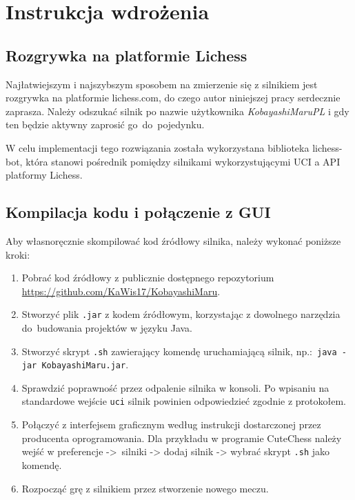 \chapter{Instrukcja wdrożenia}
\label{ch:instrukcja-wdrozenia}

\section{Rozgrywka na platformie Lichess}
\label{sec:rozgrywka-na-platformie-lichess}
Najłatwiejszym i najszybszym sposobem na zmierzenie się z silnikiem jest rozgrywka na platformie lichess.com, do czego autor niniejszej pracy serdecznie zaprasza.
Należy odszukać silnik po nazwie użytkownika \textit{KobayashiMaruPL} i gdy ten będzie aktywny zaprosić go~do~pojedynku.

W celu implementacji tego rozwiązania została wykorzystana biblioteka lichess-bot, która stanowi pośrednik pomiędzy silnikami wykorzystującymi UCI a API platformy Lichess. \cite{lichess-bot-docs}

\section{Kompilacja kodu i połączenie z GUI}
\label{sec:kompilacja-kodu-i-polaczenie-z-gui}

Aby własnoręcznie skompilować kod źródłowy silnika, należy wykonać poniższe kroki:
\begin{enumerate}
    \item Pobrać kod źródłowy z publicznie dostępnego repozytorium \url{https://github.com/KaWis17/KobayashiMaru}.
    \item Stworzyć plik \texttt{.jar} z kodem źródłowym, korzystając z dowolnego narzędzia do~budowania projektów w języku Java.
    \item Stworzyć skrypt \texttt{.sh} zawierający komendę uruchamiającą silnik, np.:~\texttt{java~-jar~KobayashiMaru.jar}.
    \item Sprawdzić poprawność przez odpalenie silnika w konsoli.
    Po wpisaniu na standardowe wejście \texttt{uci} silnik powinien odpowiedzieć zgodnie z protokołem.
    \item Połączyć z interfejsem graficznym według instrukcji dostarczonej przez producenta oprogramowania.
    Dla przykładu w programie CuteChess należy wejść w preferencje ->~silniki -> dodaj silnik -> wybrać skrypt \texttt{.sh} jako komendę.
    \item Rozpocząć grę z silnikiem przez stworzenie nowego meczu.
\end{enumerate}

